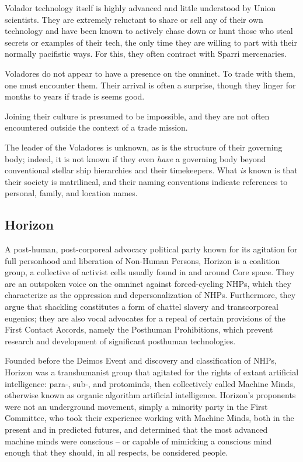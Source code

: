 Volador technology itself is highly advanced and little understood by Union scientists. They are
extremely reluctant to share or sell any of their own technology and have been known to actively
chase down or hunt those who steal secrets or examples of their tech, the only time they are
willing to part with their normally pacifistic ways. For this, they often contract with Sparri
mercenaries.

Voladores do not appear to have a presence on the omninet. To trade with them, one must
encounter them. Their arrival is often a surprise, though they linger for months to years if trade is
seems good.

Joining their culture is presumed to be impossible, and they are not often encountered outside
the context of a trade mission.

The leader of the Voladores is unknown, as is the structure of their governing body; indeed, it is
not known if they even \textit{have} a governing body beyond conventional stellar ship hierarchies and
their timekeepers. What \textit{is} known is that their society is matrilineal, and their naming conventions
indicate references to personal, family, and location names.

\subsection{Horizon}

A post-human, post-corporeal advocacy political party known for its agitation for full personhood
and liberation of Non-Human Persons, Horizon is a coalition group, a collective of activist cells
usually found in and around Core space. They are an outspoken voice on the omninet against
forced-cycling NHPs, which they characterize as the oppression and depersonalization of NHPs.
Furthermore, they argue that shackling constitutes a form of chattel slavery and transcorporeal
eugenics; they are also vocal advocates for a repeal of certain provisions of the First Contact
Accords, namely the Posthuman Prohibitions, which prevent research and development of
significant posthuman technologies.

Founded before the Deimos Event and discovery and classification of NHPs, Horizon was a
transhumanist group that agitated for the rights of extant artificial intelligence: para-, sub-, and
protominds, then collectively called Machine Minds, otherwise known as organic algorithm
artificial intelligence. Horizon’s proponents were not an underground movement, simply a
minority party in the First Committee, who took their experience working with Machine Minds,
both in the present and in predicted futures, and determined that the most advanced machine
minds were conscious -- or capable of mimicking a conscious mind enough that they should, in
all respects, be considered people.

